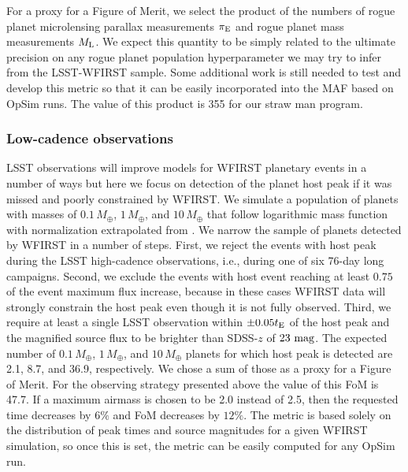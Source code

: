For a proxy for a Figure of Merit, we select the product of the numbers of
rogue planet microlensing parallax measurements $\pi_{\rm E}$
and rogue planet mass measurements $M_{\rm L}$.
We expect this quantity to be simply related to the ultimate precision
on any rogue planet population hyperparameter we may try to infer from
the LSST-WFIRST sample.
Some additional
work is still needed to test and develop this metric so that it can be easily incorporated into the MAF based on OpSim runs.
The value of this product is 355 for our straw man program.


\subsubsection{Low-cadence observations}

LSST observations will improve models for WFIRST planetary events
in a number of ways but here we focus on detection of the planet
host peak if it was missed and poorly constrained by WFIRST. We simulate
a population of planets with masses of $0.1\,M_\oplus$, $1\,M_\oplus$,
and $10\,M_\oplus$ that follow logarithmic mass function with
normalization extrapolated from \citep{2012Natur.481..167C}. We narrow the sample of
planets detected by WFIRST in a number of steps. First, we reject the events
with host peak during the LSST high-cadence observations, i.e., during one of six
76-day long campaigns. Second, we exclude the events with host event reaching
at least $0.75$ of the event maximum flux increase, because in these cases WFIRST
data will strongly constrain the host peak even though it is not fully observed.
Third, we require at least a single LSST observation within $\pm0.05t_{\rm E}$ of
the host peak and the magnified source flux to be brighter than SDSS-$z$ of $23~{\rm mag}$.
The expected number of $0.1\,M_\oplus$, $1\,M_\oplus$, and $10\,M_\oplus$
planets for which host peak is detected are 2.1, 8.7, and 36.9, respectively.
We chose a sum of those as a proxy for a Figure of Merit. For the observing strategy
presented above the value of this FoM is 47.7. If a maximum airmass is chosen to be
2.0 instead of 2.5, then the requested time decreases by $6\%$ and FoM decreases by $12\%$.
The metric is based solely on the distribution of peak times and source magnitudes
for a given WFIRST simulation, so once this is set, the metric can
be easily computed for any OpSim run.



